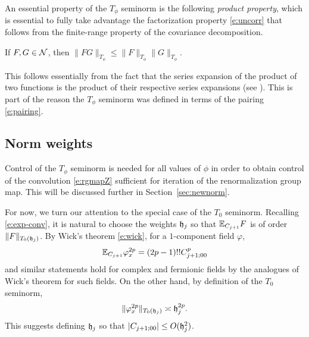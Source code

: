 
An essential property of the $T_\phi$ seminorm is the following \emph{product property},
which is essential to fully take advantage the factorization property \eqref{e:uncorr}
that follows from the finite-range property of the covariance decomposition.

\begin{prop}
\label{prop:prod}
If $F, G \in \mathcal{N}$, then $\|F G\|_{T_\phi} \le \|F\|_{T_\phi} \|G\|_{T_\phi}$.
\end{prop}

\begin{rk}
This follows essentially from the fact that
the series expansion of the product of two functions is the product of their
respective series expansions (see \cite{BS-rg-norm}). This is part of the reason
the $T_\phi$ seminorm was defined in terms of the pairing \eqref{e:pairing}.
\end{rk}


\subsection{Norm weights}
\label{sec:weights}

Control of the $T_\phi$ seminorm is needed for all values of
$\phi$ in order to obtain control of the convolution \eqref{e:rgmapZ} sufficient
for iteration of the renormalization group map.
This will be discussed further in Section~\ref{sec:newnorm}.

For now, we turn our attention to the special case of the $T_0$ seminorm. Recalling
\eqref{e:exp-conv}, it is natural to choose the weights $\mathfrak{h}_j$ so that
$\mathbb{E}_{C_{j+1}} F$ is of order $\|F\|_{T_0(\mathfrak{h}_j)}$.
By Wick's theorem \eqref{e:wick}, for a $1$-component field $\varphi$,
\begin{equation}
\mathbb{E}_{C_{j+1}} \varphi_x^{2p} = (2p - 1)!! C_{j+1;00}^p
\end{equation}
and similar statements hold for complex and fermionic fields by the analogues of
Wick's theorem for such fields.
On the other hand, by definition of the $T_0$ seminorm,
\begin{equation}
\label{e:gauss-moments}
\|\varphi_x^{2p}\|_{T_0(\mathfrak{h}_j)} \asymp \mathfrak{h}_j^{2p}.
\end{equation}
This suggests defining $\mathfrak{h}_j$ so that $|C_{j+1;00}| \le O(\mathfrak{h}^2_j)$.

